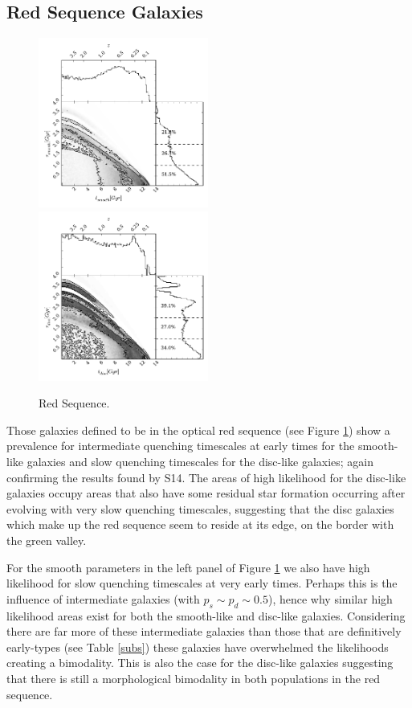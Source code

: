 \documentclass[useAMS,usenatbib]{mn2e}
\begin{document}
\subsection{Red Sequence Galaxies}\label{rs}
\begin{figure}
\includegraphics[width=0.4975\textwidth]{red_smooth.pdf}
\includegraphics[width=0.4975\textwidth]{red_disc.pdf}
\caption[8pt]{Red Sequence.}
\label{red_s}
\end{figure}
Those galaxies defined to be in the optical red sequence (see Figure \ref{red_s}) show a prevalence for intermediate quenching timescales at early times for the smooth-like galaxies and slow quenching timescales for the disc-like galaxies; again confirming the results found by S14. The areas of high likelihood for the disc-like galaxies occupy areas that also have some residual star formation occurring after evolving with very slow quenching timescales, suggesting that the disc galaxies which make up the red sequence seem to reside at its edge, on the border with the green valley. 

For the smooth parameters in the left panel of Figure \ref{red_s} we also have high likelihood for slow quenching timescales at very early times. Perhaps this is the influence of intermediate galaxies (with $p_s \sim p_d \sim 0.5$), hence why similar high likelihood areas exist for both the smooth-like and disc-like galaxies. Considering there are far more of these intermediate galaxies than those that are definitively early-types (see Table \ref{subs}) these galaxies have overwhelmed the likelihoods creating a bimodality. This is also the case for the disc-like galaxies suggesting that there is still a morphological bimodality in both populations in the red sequence.
\end{document}
